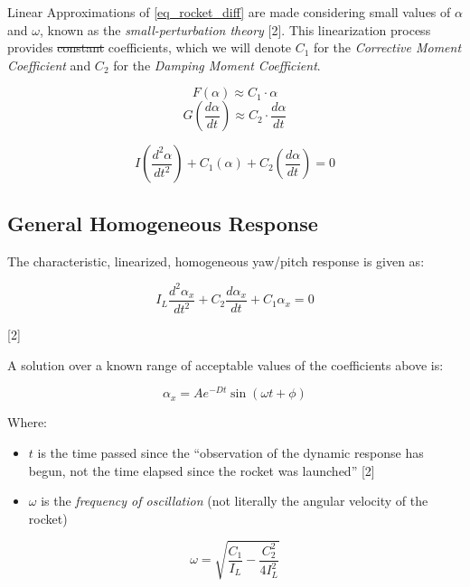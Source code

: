 \documentclass[]{article}
\providecommand{\tightlist}{%
  \setlength{\itemsep}{0pt}\setlength{\parskip}{0pt}}
\begin{document}
Linear Approximations of \ref{eq_rocket_diff} are made considering small
values of \(\alpha\) and \(\omega\), known as the
\emph{small-perturbation theory} {[}2{]}. This linearization process
provides \sout{constant} coefficients, which we will denote \(C_1\) for
the \emph{Corrective Moment Coefficient} and \(C_2\) for the
\emph{Damping Moment Coefficient}.

\[
F(\alpha) \approx C_1 \cdot \alpha 
\] \[
G \left(\dfrac{d\alpha}{dt} \right) \approx C_2 \cdot \dfrac{d\alpha}{dt} 
\]

\begin{equation}
\label{eq_rocket_diff_linearized}
I \left( \dfrac{d^2\alpha}{dt^2} \right) + C_1 (\alpha) + C_2 \left(\dfrac{d\alpha}{dt} \right) = 0
\end{equation}

\subsection{General Homogeneous
Response}\label{general-homogeneous-response}

The characteristic, linearized, homogeneous yaw/pitch response is given
as:

\begin{equation}
I_L \dfrac{d^2 \alpha_x}{dt^2} + C_2 \dfrac{d \alpha_x}{dt} + C_1 \alpha_x = 0
\end{equation}

{[}2{]}

A solution over a known range of acceptable values of the coefficients
above is:

\begin{equation}
\label{eq_yaw_pitch_time_response}
\alpha_x = A e^{-Dt} \sin(\omega t + \phi)
\end{equation}

Where:

\begin{itemize}
\tightlist
\item
  \(t\) is the time passed since the ``observation of the dynamic
  response has begun, not the time elapsed since the rocket was
  launched'' {[}2{]}
\item
  \(\omega\) is the \emph{frequency of oscillation} (not literally the
  angular velocity of the rocket)
\end{itemize}

\begin{equation}
\label{eq_frequency_oscillation}
\omega = \sqrt{ \dfrac{C_1}{I_L} - \dfrac{C_2^2}{4 I_L^2} }
\end{equation}
\end{document}

